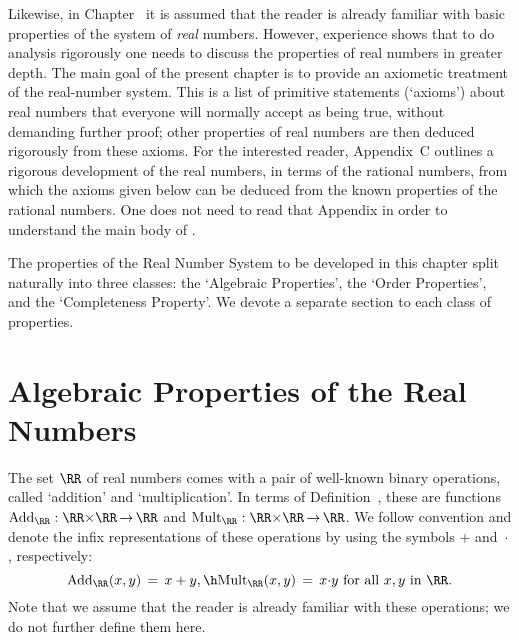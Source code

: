         Likewise, in Chapter~ it is assumed that the reader is already familiar with basic properties of the system of {\em real} numbers.
    However, experience shows that to do analysis rigorously one needs to discuss the properties of real numbers in greater depth.
    The main goal of the present chapter is to provide an axiometic treatment of the real-number system.
    This is a list of primitive statements (`axioms') about real numbers that everyone will normally accept as being true, without demanding further proof;
    other properties of real numbers are then deduced rigorously from these axioms.
    For the interested reader, Appendix~C outlines a rigorous development of the real numbers, in terms of the rational numbers,
    from which the axioms given below can be deduced from the known properties of the rational numbers.
    One does not need to read that Appendix in order to understand the main body of {\TheseNotes}.

\V

        The properties of the Real Number System to be developed in this chapter split naturally into three classes:
    the `Algebraic Properties', the `Order Properties', and the `Completeness Property'.
    We devote a separate section to each class of properties.


\V
\V


                        \section{{\bf Algebraic Properties of the Real Numbers}}
                        \label{SectB10}
        
\V
\V

        The set ${\RR}$ of real numbers comes with a pair of well-known binary operations, called `addition' and `multiplication'.
    In terms of Definition~, these are functions $\mbox{Add}_{{\RR}}:{\RR}{\times}{\RR} \,{\rightarrow}\, {\RR}$ and $\mbox{Mult}_{{\RR}}:{\RR}{\times}{\RR} \,{\rightarrow}\, {\RR}$.
    We follow convention and denote the infix representations of these operations by using the symbols $+$ and~${\cdot}$, respectively:
        \begin{displaymath}
        \mbox{Add}_{{\RR}}(x,y) \,=\, x+y, \h \mbox{Mult}_{{\RR}}(x,y) \,=\, x{\cdot}y \mbox{ for all $x,y$ in ${\RR}$}.
        \end{displaymath}
    Note that we assume that the reader is already familiar with these operations; we do not further define them here.

